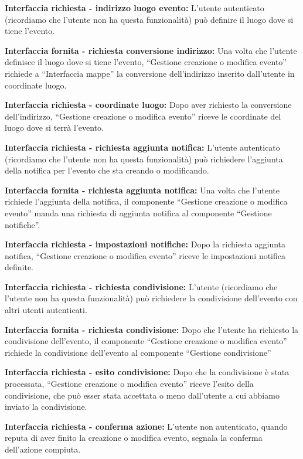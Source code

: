 \begin{listaPersonale}[DCI]{}
    \textbf{Interfaccia richiesta - indirizzo luogo evento:} L'utente autenticato (ricordiamo che l'utente non ha questa funzionalità) può definire il luogo dove si tiene l'evento.

    \textbf{Interfaccia fornita - richiesta conversione indirizzo:} Una volta che l'utente definisce il luogo dove si tiene l'evento, “Gestione creazione o modifica evento” richiede a “Interfaccia mappe” la conversione dell'indirizzo inserito dall'utente in coordinate luogo.

    \textbf{Interfaccia richiesta - coordinate luogo:} Dopo aver richiesto la conversione dell'indirizzo, “Gestione creazione o modifica evento” riceve le coordinate del luogo dove si terrà l'evento.

    \textbf{Interfaccia richiesta - richiesta aggiunta notifica:} L'utente autenticato (ricordiamo che l'utente non ha questa funzionalità)  può richiedere l'aggiunta della notifica per l'evento che sta creando o modificando.

    \textbf{Interfaccia fornita - richiesta aggiunta notifica:} Una volta che l'utente richiede l'aggiunta della notifica, il componente “Gestione creazione o modifica evento” manda una richiesta di aggiunta notifica al componente “Gestione notifiche”.

    \textbf{Interfaccia richiesta - impostazioni notifiche:} Dopo la richiesta aggiunta notifica, “Gestione creazione o modifica evento” riceve le impostazioni notifica definite.

    \textbf{Interfaccia richiesta - richiesta condivisione:} L'utente (ricordiamo che l'utente non ha questa funzionalità) può richiedere la condivisione dell'evento con altri utenti autenticati.

    \textbf{Interfaccia fornita - richiesta condivisione:} Dopo che l'utente ha richiesto la condivisione dell'evento, il componente “Gestione creazione o modifica evento” richiede la condivisione dell'evento al componente “Gestione condivisione”

    \textbf{Interfaccia richiesta - esito condivisione:} Dopo che la condivisione è stata processata, “Gestione creazione o modifica evento” riceve l'esito della condivisione, che può esser stata accettata o meno dall'utente a cui abbiamo inviato la condivisione.

    \textbf{Interfaccia richiesta - conferma azione:} L'utente non autenticato, quando reputa di aver finito la creazione o modifica evento, segnala la conferma dell'azione compiuta.


\end{listaPersonale}
